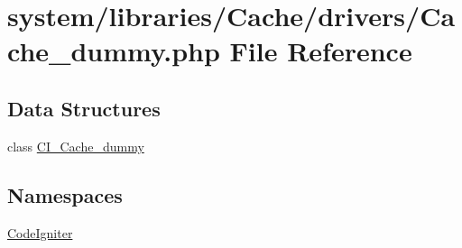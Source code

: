 \hypertarget{_cache__dummy_8php}{}\section{system/libraries/\+Cache/drivers/\+Cache\+\_\+dummy.php File Reference}
\label{_cache__dummy_8php}
\subsection*{Data Structures}
\begin{DoxyCompactItemize}
\item 
class \mbox{\hyperlink{class_c_i___cache__dummy}{C\+I\+\_\+\+Cache\+\_\+dummy}}
\end{DoxyCompactItemize}
\subsection*{Namespaces}
\begin{DoxyCompactItemize}
\item 
 \mbox{\hyperlink{namespace_code_igniter}{Code\+Igniter}}
\end{DoxyCompactItemize}
